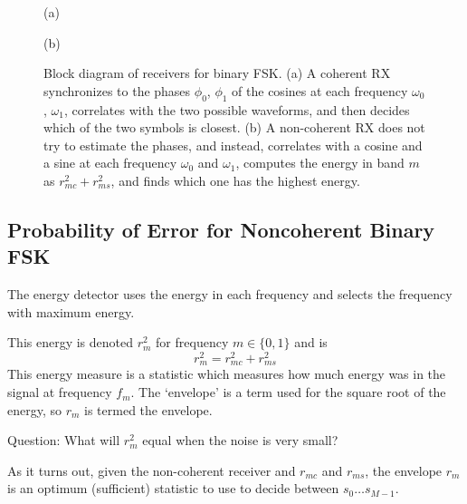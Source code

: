 \begin{figure}[htbp]
  (a) 
  
  (b) 
  
  \caption{Block diagram of receivers for binary FSK. (a) A coherent RX synchronizes to the phases $\phi_0$, $\phi_1$ of the cosines at each frequency $\omega_0$, $\omega_1$, correlates with the two possible waveforms, and then decides which of the two symbols is closest.  (b) A non-coherent RX does not try to estimate the phases, and instead, correlates with a cosine and a sine at each frequency $\omega_0$ and $\omega_1$, computes the energy in band $m$ as $r_{mc}^2 + r_{ms}^2$, and finds which one has the highest energy.
  \label{F:FSK_block_diagrams}}
\end{figure}

\subsection{Probability of Error for Noncoherent Binary FSK}

The energy detector uses the energy in each frequency and selects the frequency with maximum energy.

This energy is denoted $r_m^2$ for frequency $m\in \{0,1\}$ and is
\[
 r_m^2 = r_{mc}^2 + r_{ms}^2
\]
This energy measure is a statistic which measures how much energy
was in the signal at frequency $f_m$.  The `envelope' is a term used
for the square root of the energy, so $r_m$ is termed the envelope.

Question: What will $r_m^2$ equal when the noise is very small?

As it turns out, given the non-coherent receiver and $r_{mc}$ and
$r_{ms}$, the envelope $r_m$ is an optimum (sufficient) statistic to
use to decide between $s_0 \ldots s_{M-1}$.

